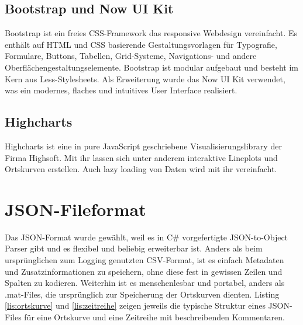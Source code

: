 \subsection{Bootstrap und Now UI Kit}

Bootstrap \cite{bootstrap} ist ein freies CSS-Framework das responsive Webdesign vereinfacht. Es enthält auf HTML und CSS basierende Gestaltungsvorlagen für Typografie, Formulare, Buttons, Tabellen, Grid-Systeme, Navigations- und andere Oberflächengestaltungselemente. Bootstrap ist modular aufgebaut und besteht im Kern aus Less-Stylesheets. Als Erweiterung wurde das Now UI Kit \cite{nowUIkit} verwendet, was ein modernes, flaches und intuitives User Interface realisiert.

\subsection{Highcharts}

Highcharts \cite{highCharts} ist eine in pure JavaScript geschriebene Visualisierungslibrary der Firma Highsoft. Mit ihr lassen sich unter anderem interaktive Lineplots und Ortskurven erstellen. Auch lazy loading von Daten wird mit ihr vereinfacht.

\section{JSON-Fileformat}

Das JSON-Format wurde gewählt, weil es in C\# vorgefertigte JSON-to-Object Parser gibt und es flexibel und beliebig erweiterbar ist. Anders als beim ursprünglichen zum Logging genutzten CSV-Format, ist es einfach Metadaten und Zusatzinformationen zu speichern, ohne diese fest in gewissen Zeilen und Spalten zu kodieren. Weiterhin ist es menschenlesbar und portabel, anders als .mat-Files, die ursprünglich zur Speicherung der Ortskurven dienten. Listing \ref{lis:ortskurve} und \ref{lis:zeitreihe} zeigen jeweils die typische Struktur eines JSON-Files für eine Ortskurve und eine Zeitreihe mit beschreibenden Kommentaren.



